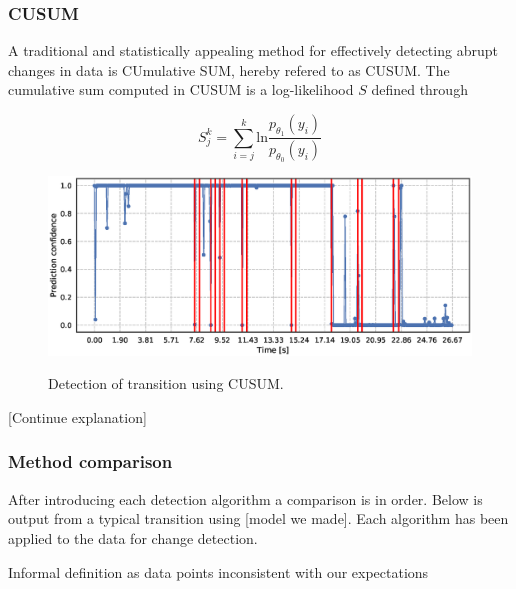 \subsubsection{CUSUM}

A traditional and statistically appealing method for effectively detecting abrupt changes in data is CUmulative SUM, hereby refered to as CUSUM. The cumulative sum computed in CUSUM is a log-likelihood $S$ defined through

\begin{equation}
	S_j^k = \sum_{i=j}^k \text{ln}\frac{p_{\theta_1}(y_i)}{p_{\theta_0}(y_i)}
\end{equation}

\begin{figure}
	\includegraphics[scale=0.5]{figs_temp/detect_cusum}
	\label{fig:detect_cusum}
	\caption{Detection of transition using CUSUM.}
\end{figure}

[Continue explanation]


\citep{basseville_nikiforov_1993}




\subsubsection{Method comparison}

After introducing each detection algorithm a comparison is in order. Below is output from a typical transition using [model we made]. Each algorithm has been applied to the data for change detection.


Informal definition as data points inconsistent with our expectations
